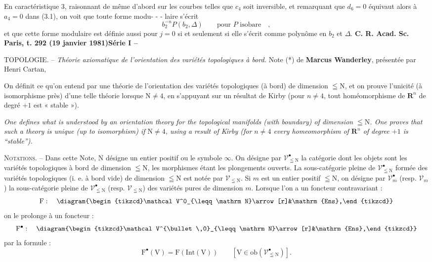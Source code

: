 En caractéristique 3, raisonnant de même d'abord sur les courbes telles que $c_4$ soit inversible, et remarquant que $d_6=0$ équivaut alors à $a_4=0$ dans (3.1), on voit que toute forme modu-
-  -
laire s'écrit
\[
b_2^{-n}P(b_2,\Delta)\qquad\text{pour }P\text{ isobare}\quad,
\]
et que cette forme modulaire est définie aussi pour $j=0$ si et seulement si elle s'écrit comme polynôme en $b_2$ et $\Delta$.
\textbf{C. R. Acad. Sc. Paris, t. 292 (19 janvier 1981)}\hfill\textbf{Série I -- }

TOPOLOGIE. -- \textit{Théorie axiomatique de l'orientation des variétés topologiques à bord.}
Note (*) de \textbf{Marcus Wanderley}, présentée par Henri Cartan,

On définit ce qu'on entend par une théorie de l'orientation des variétés topologiques (à bord) de dimension $\leqq\mathrm N$, et on prouve l'unicité (à isomorphisme près) d'une telle théorie lorsque $\mathrm N\ne4$, en s'appuyant sur un résultat de Kirby (pour $n\ne4$, tout homéomorphisme de $\mathbf R^n$ de degré $+1$ est « stable »).

\textit{One defines what is understood by an orientation theory for the topological manifolds (with boundary) of dimension $\leqq\mathrm N$. One proves that such a theory is unique (up to isomorphism) if $\mathrm N\ne4$, using a result of Kirby (for $n\ne4$ every homeomorphism of $\mathbf R^n$ of degree $+1$ is ``stable'').}

\textsc{Notations}. -- Dans cette Note, $\mathrm N$ désigne un entier positif ou le symbole $\infty$. On désigne par $\mathcal V^\bullet_{\leqq\mathrm N}$ la catégorie dont les objets sont les variétés topologiques à bord de dimension $\leqq\mathrm N$, les morphismes étant les plongements ouverts. La sous-catégorie pleine de $\mathcal V^\bullet_{\leqq\mathrm N}$ formée des variétés topologiques (i. e. à bord vide) de dimension $\leqq\mathrm N$ est notée par $\mathcal V_{\leqq\mathrm N}$. Si $m$ est un entier positif $\leqq\mathrm N$, on désigne par $\mathcal V^\bullet_m$ (resp. $\mathcal V_m$) la sous-catégorie pleine de $\mathcal V^\bullet_{\leqq\mathrm N}$ (resp. $\mathcal V_{\leqq\mathrm N}$) des variétés pures de dimension $m$. Lorsque l'on a un foncteur contravariant :
\[
\mathrm F:\quad\diagram{\begin{tikzcd}\mathcal V^0_{\leqq\mathrm N}\arrow[r]&\mathrm{Ens},\end{tikzcd}}
\]
on le prolonge à un foncteur :
\[
\mathrm F^\bullet:\quad\diagram{\begin{tikzcd}\mathcal V^{\bullet\,0}_{\leqq\mathrm N}\arrow[r]&\mathrm{Ens},\end{tikzcd}}
\]
par la formule :
\[
\mathrm F^\bullet(\mathrm V)=\mathrm F(\mathrm{Int}(\mathrm V))\qquad[\mathrm V\in\mathrm{ob}(\mathcal V^\bullet_{\leqq\mathrm N})].
\]

